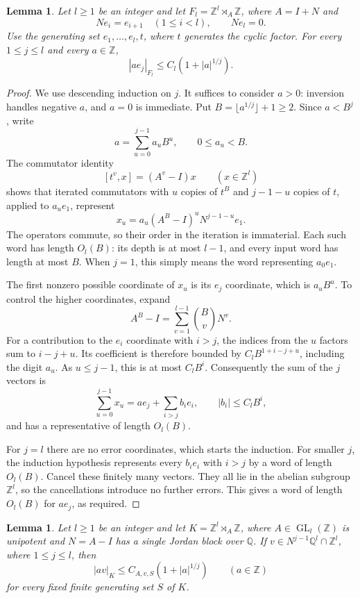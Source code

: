 \documentclass[11pt,letterpaper]{amsart}
\numberwithin{equation}{section}
\newtheorem{lemma}[theorem]{Lemma}
\theoremstyle{remark}
\newcommand{\Z}{\mathbb Z}
\newcommand{\Q}{\mathbb Q}
\newcommand{\GL}{\operatorname{GL}}
\begin{document}
\begin{lemma}\label{lem:blockcompression}
Let $l\ge1$ be an integer and let $F_l=\Z^l\rtimes_A\Z$, where $A=I+N$ and
\[
 Ne_i=e_{i+1}\quad(1\le i<l),\qquad Ne_l=0.
\]
Use the generating set $e_1,\ldots,e_l,t$, where $t$ generates the cyclic
factor. For every $1\le j\le l$ and every $a\in\Z$,
\[
 |ae_j|_{F_l}\le C_l(1+|a|^{1/j}).
\]
\end{lemma}

\begin{proof}
We use descending induction on $j$. It suffices to consider $a>0$:
inversion handles negative $a$, and $a=0$ is immediate. Put
$B=\lfloor a^{1/j}\rfloor+1\ge2$. Since $a<B^j$, write
\[
 a=\sum_{u=0}^{j-1}a_u B^u,\qquad 0\le a_u<B.
\]
The commutator identity
\[
 [t^v,x]=(A^v-I)x\qquad(x\in\Z^l)
\]
shows that iterated commutators with $u$ copies of $t^B$ and
$j-1-u$ copies of $t$, applied to $a_ue_1$, represent
\[
 x_u=a_u(A^B-I)^uN^{j-1-u}e_1.
\]
The operators commute, so their order in the iteration is immaterial.
Each such word has length $O_l(B)$: its depth is at most $l-1$, and
every input word has length at most $B$. When $j=1$, this simply means
the word representing $a_0e_1$.

The first nonzero possible coordinate of $x_u$ is its $e_j$ coordinate,
which is $a_u B^u$. To control the higher coordinates, expand
\[
 A^B-I=\sum_{v=1}^{l-1}\binom Bv N^v.
\]
For a contribution to the $e_i$ coordinate with $i>j$, the indices from
the $u$ factors sum to $i-j+u$. Its coefficient is therefore bounded by
$C_lB^{1+i-j+u}$, including the digit $a_u$. As $u\le j-1$, this is
at most $C_lB^i$. Consequently the sum of the $j$ vectors is
\[
 \sum_{u=0}^{j-1}x_u=ae_j+\sum_{i>j}b_i e_i,
 \qquad |b_i|\le C_lB^i,
\]
and has a representative of length $O_l(B)$.

For $j=l$ there are no error coordinates, which starts the induction.
For smaller $j$, the induction hypothesis represents every $b_i e_i$
with $i>j$ by a word of length $O_l(B)$. Cancel these finitely many
vectors. They all lie in the abelian subgroup $\Z^l$, so the
cancellations introduce no further errors. This gives a word of length
$O_l(B)$ for $ae_j$, as required.
\end{proof}

\begin{lemma}\label{lem:compression}
Let $l\ge1$ be an integer and let $K=\Z^l\rtimes_A\Z$, where $A\in\GL_l(\Z)$ is unipotent and
$N=A-I$ has a single Jordan block over $\Q$. If
$v\in N^{j-1}\Q^l\cap\Z^l$, where $1\le j\le l$, then
\[
 |av|_K\le C_{A,v,S}(1+|a|^{1/j})\qquad(a\in\Z)
\]
for every fixed finite generating set $S$ of $K$.
\end{lemma}
\end{document}
